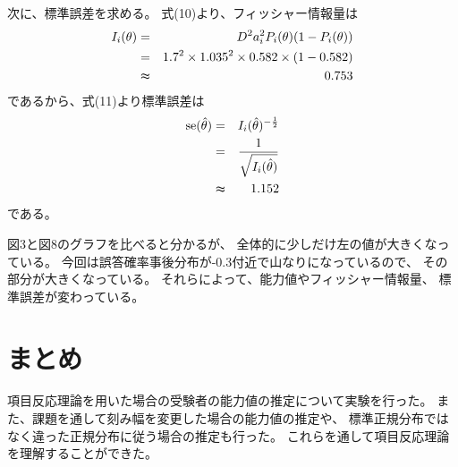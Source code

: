 \documentclass[12pt]{jarticle}
\begin{document}
次に、標準誤差を求める。
式(10)より、フィッシャー情報量は
\begin{eqnarray}
    I_i(\theta)&=&D^2a_i^2 P_i(\theta)(1-P_i(\theta)) \nonumber\\
    &=&1.7^2 \times 1.035^2\times 0.582\times (1-0.582) \nonumber\\
    &\thickapprox& 0.753 \nonumber
\end{eqnarray}
であるから、式(11)より標準誤差は
\begin{eqnarray}
    {\rm se}(\hat{\theta})&=&I_i(\hat{\theta})^{-\frac{1}{2}} \nonumber\\
    &=&\frac{1}{\sqrt{I_i(\hat{\theta})}}\nonumber\\
    &\thickapprox&1.152\nonumber
\end{eqnarray}
である。

図3と図8のグラフを比べると分かるが、
全体的に少しだけ左の値が大きくなっている。
今回は誤答確率事後分布が-0.3付近で山なりになっているので、
その部分が大きくなっている。
それらによって、能力値やフィッシャー情報量、
標準誤差が変わっている。


\section{まとめ}
項目反応理論を用いた場合の受験者の能力値の推定について実験を行った。
また、課題を通して刻み幅を変更した場合の能力値の推定や、
標準正規分布ではなく違った正規分布に従う場合の推定も行った。
これらを通して項目反応理論を理解することができた。


\clearpage
\appendix
\end{document}

